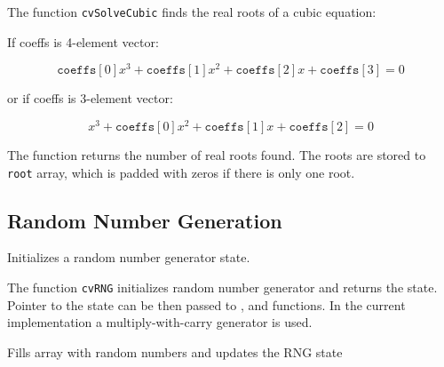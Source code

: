 \begin{description}
\end{description}

The function \texttt{cvSolveCubic} finds the real roots of a cubic equation:

If coeffs is 4-element vector:

\[
\texttt{coeffs}[0] x^3 + \texttt{coeffs}[1] x^2 + \texttt{coeffs}[2] x + \texttt{coeffs}[3] = 0
\]

or if coeffs is 3-element vector:

\[
x^3 + \texttt{coeffs}[0] x^2 + \texttt{coeffs}[1] x + \texttt{coeffs}[2] = 0
\]

The function returns the number of real roots found. The roots are
stored to \texttt{root} array, which is padded with zeros if there is
only one root.

\subsection{Random Number Generation}

\label{RNG}

Initializes a random number generator state.


\begin{description}
\end{description}


The function \texttt{cvRNG} initializes random number generator
and returns the state. Pointer to the state can be then passed to
,  and  functions. In the
current implementation a multiply-with-carry generator is used.

\label{RandArr}

Fills array with random numbers and updates the RNG state


